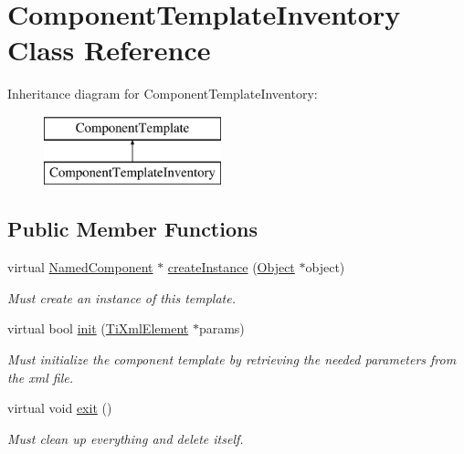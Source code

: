 \hypertarget{classComponentTemplateInventory}{
\section{\-Component\-Template\-Inventory \-Class \-Reference}
\label{d8/d45/classComponentTemplateInventory}
}
\-Inheritance diagram for \-Component\-Template\-Inventory\-:\begin{figure}[H]
\begin{center}
\leavevmode
\includegraphics[height=2.000000cm]{d8/d45/classComponentTemplateInventory}
\end{center}
\end{figure}
\subsection*{\-Public \-Member \-Functions}
\begin{DoxyCompactItemize}
\item 
\hypertarget{classComponentTemplateInventory_a830ac26cad9bdb85ddc13a72ff826799}{
virtual \hyperlink{classNamedComponent}{\-Named\-Component} $\ast$ \hyperlink{classComponentTemplateInventory_a830ac26cad9bdb85ddc13a72ff826799}{create\-Instance} (\hyperlink{classObject}{\-Object} $\ast$object)}
\label{d8/d45/classComponentTemplateInventory_a830ac26cad9bdb85ddc13a72ff826799}

\begin{DoxyCompactList}\small\item\em \-Must create an instance of this template. \end{DoxyCompactList}\item 
\hypertarget{classComponentTemplateInventory_ac16cee2c2f28ec65e043b7766d61af25}{
virtual bool \hyperlink{classComponentTemplateInventory_ac16cee2c2f28ec65e043b7766d61af25}{init} (\hyperlink{classTiXmlElement}{\-Ti\-Xml\-Element} $\ast$params)}
\label{d8/d45/classComponentTemplateInventory_ac16cee2c2f28ec65e043b7766d61af25}

\begin{DoxyCompactList}\small\item\em \-Must initialize the component template by retrieving the needed parameters from the xml file. \end{DoxyCompactList}\item 
\hypertarget{classComponentTemplateInventory_a713a9fa3c3eb28f56745fc16a4df8543}{
virtual void \hyperlink{classComponentTemplateInventory_a713a9fa3c3eb28f56745fc16a4df8543}{exit} ()}
\label{d8/d45/classComponentTemplateInventory_a713a9fa3c3eb28f56745fc16a4df8543}

\begin{DoxyCompactList}\small\item\em \-Must clean up everything and delete itself. \end{DoxyCompactList}\end{DoxyCompactItemize}
